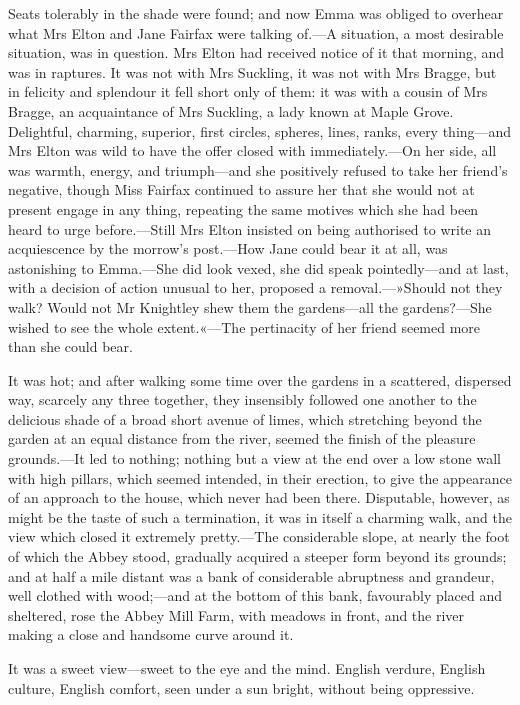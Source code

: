 Seats tolerably in the shade were found; and now Emma was obliged to overhear what Mrs Elton and Jane Fairfax were talking of.—A situation, a most desirable situation, was in question. Mrs Elton had received notice of it that morning, and was in raptures. It was not with Mrs Suckling, it was not with Mrs Bragge, but in felicity and splendour it fell short only of them: it was with a cousin of Mrs Bragge, an acquaintance of Mrs Suckling, a lady known at Maple Grove. Delightful, charming, superior, first circles, spheres, lines, ranks, every thing—and Mrs Elton was wild to have the offer closed with immediately.—On her side, all was warmth, energy, and triumph—and she positively refused to take her friend's negative, though Miss Fairfax continued to assure her that she would not at present engage in any thing, repeating the same motives which she had been heard to urge before.—Still Mrs Elton insisted on being authorised to write an acquiescence by the morrow's post.—How Jane could bear it at all, was astonishing to Emma.—She did look vexed, she did speak pointedly—and at last, with a decision of action unusual to her, proposed a removal.—»Should not they walk? Would not Mr Knightley shew them the gardens—all the gardens?—She wished to see the whole extent.«—The pertinacity of her friend seemed more than she could bear.

It was hot; and after walking some time over the gardens in a scattered, dispersed way, scarcely any three together, they insensibly followed one another to the delicious shade of a broad short avenue of limes, which stretching beyond the garden at an equal distance from the river, seemed the finish of the pleasure grounds.—It led to nothing; nothing but a view at the end over a low stone wall with high pillars, which seemed intended, in their erection, to give the appearance of an approach to the house, which never had been there. Disputable, however, as might be the taste of such a termination, it was in itself a charming walk, and the view which closed it extremely pretty.—The considerable slope, at nearly the foot of which the Abbey stood, gradually acquired a steeper form beyond its grounds; and at half a mile distant was a bank of considerable abruptness and grandeur, well clothed with wood;—and at the bottom of this bank, favourably placed and sheltered, rose the Abbey Mill Farm, with meadows in front, and the river making a close and handsome curve around it.

It was a sweet view—sweet to the eye and the mind. English verdure, English culture, English comfort, seen under a sun bright, without being oppressive.

